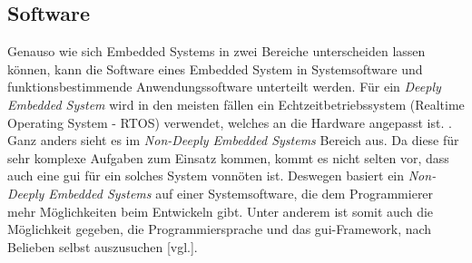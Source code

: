 \subsection{Software}
\label{subsec:EmbeddedSoftware}
Genauso wie sich Embedded Systems in zwei Bereiche unterscheiden lassen können, kann die
Software eines Embedded System in Systemsoftware und funktionsbestimmende
Anwendungssoftware unterteilt werden.
Für ein \emph{Deeply Embedded System} wird in den meisten fällen ein Echtzeitbetriebssystem
(Realtime Operating System - RTOS) verwendet, welches an die Hardware angepasst ist. .
\newline
\newline
Ganz anders sieht es im \emph{Non-Deeply Embedded Systems} Bereich aus. Da diese für sehr
komplexe Aufgaben zum Einsatz kommen, kommt es nicht selten
vor, dass auch eine \ac{gui} für ein solches System vonnöten ist. Deswegen basiert ein
\emph{Non-Deeply
Embedded Systems} auf einer Systemsoftware, die dem Programmierer mehr Möglichkeiten beim
Entwickeln gibt. Unter anderem ist somit auch die Möglichkeit gegeben, die Programmiersprache und
das \ac{gui}-Framework, nach Belieben selbst auszusuchen \cite{EmbeddedLinuxQuade}[vgl.].